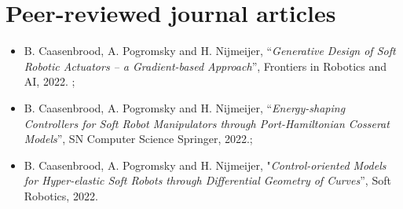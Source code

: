\section*{Peer-reviewed journal articles}
\begin{itemize}[leftmargin=4mm]
  \item B. Caasenbrood, A. Pogromsky and H. Nijmeijer, “\textit{Generative Design of Soft Robotic Actuators -- a Gradient-based Approach}”, Frontiers in Robotics and AI, 2022. \ipj;
\item  B. Caasenbrood, A. Pogromsky and H. Nijmeijer, “\textit{Energy-shaping Controllers for Soft Robot Manipulators through Port-Hamiltonian Cosserat Models}”, SN Computer Science Springer, 2022.;
\item B. Caasenbrood, A. Pogromsky and H. Nijmeijer, "\textit{Control-oriented Models for Hyper-elastic Soft Robots through Differential Geometry of Curves}”, Soft Robotics, 2022.
\end{itemize}

